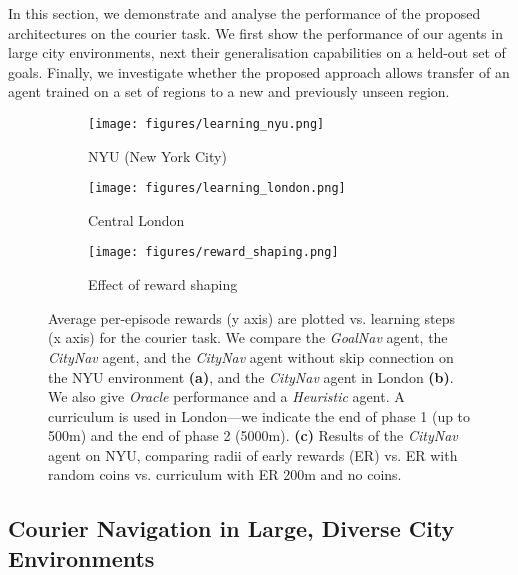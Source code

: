 
In this section, we demonstrate and analyse the performance of the proposed architectures on the courier task.
We first show the performance of our agents in large city environments, next their generalisation capabilities on a held-out set of goals. Finally, we investigate whether the proposed approach allows transfer of an agent trained on a set of regions to a new and previously unseen region.

\begin{figure}[th]
\begin{center}
\begin{subfigure}{.33\textwidth}
  \centering
  \texttt{[image: figures/learning\_nyu.png]}
  \caption{NYU (New York City)}
  \label{fig:main_results_nyu}
\end{subfigure}%
\begin{subfigure}{.33\textwidth}
  \centering
  \texttt{[image: figures/learning\_london.png]}
  \caption{Central London}
  \label{fig:main_results_london}
\end{subfigure}%
\begin{subfigure}{.33\textwidth}
  \centering
  \texttt{[image: figures/reward\_shaping.png]}
  \caption{Effect of reward shaping}
  \label{fig:reward_shaping}
\end{subfigure}%
\caption{
Average per-episode rewards (y axis) are plotted vs. learning steps (x axis) for the courier task. We compare the \emph{GoalNav} agent, the \emph{CityNav} agent, and the \emph{CityNav} agent without skip connection on the NYU environment \textbf{(a)}, and the \emph{CityNav} agent in London \textbf{(b)}. We also give \emph{Oracle} performance and a \emph{Heuristic} agent. A curriculum is used in London---we indicate the end of phase 1 (up to 500m) and the end of phase 2 (5000m). %
\textbf{(c)} Results of the \emph{CityNav} agent on NYU, comparing radii of early rewards (ER) vs. ER with random coins vs. curriculum with ER 200m and no coins.
}
\label{fig:main_results}
\end{center}
\vskip -0.25in
\end{figure}


\subsection{Courier Navigation in Large, Diverse City Environments}
\label{sec:large}


